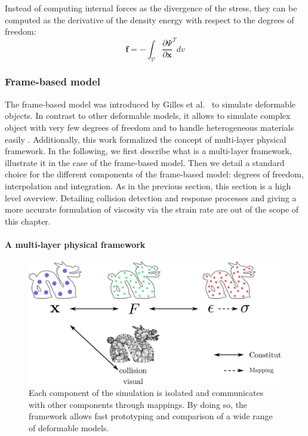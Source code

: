 Instead of computing internal forces as the divergence of the stress, they can be computed as the derivative of the density energy with respect to the degrees of freedom:
\begin{equation}
\label{eq:internalForces}
\mathbf{f} = -\int_{\mathcal{V}} \frac{\partial \Psi}{\partial \mathbf{x}}^{T} dv
\end{equation}

\subsubsection{Frame-based model}
\label{subsubsec:framebased}
The frame-based model was introduced by Gilles et al.~\cite{Gilles2011} to simulate deformable objects. In contrast to other deformable models, it allows to simulate complex object with very few degrees of freedom and to handle heterogeneous materials easily \cite{Faure2011}. 
Additionally, this work formalized the concept of multi-layer physical framework. In the following, we first describe what is a multi-layer framework, illustrate it in the case of the frame-based model. 
Then we detail a standard choice for the different components of the frame-based model: degrees of freedom, interpolation and integration. As in the previous section, this section is a high level overview. 
Detailing collision detection and response processes and giving a more accurate formulation of viscosity via the strain rate are out of the scope of this chapter.

\paragraph{A multi-layer physical framework}
 
\begin{figure}[!ht]
\centering
\includegraphics[scale=0.6]{./images/continuum_mechanics/multiLayeredFramework.png}
\caption[STAR mechanics: Multi-layer framework]{\label{fig:multiLayerFramework} Each component of the simulation is isolated and communicates with other components through mappings. By doing so, the framework allows fast prototyping and comparison of a wide range of deformable models.}
\end{figure}


